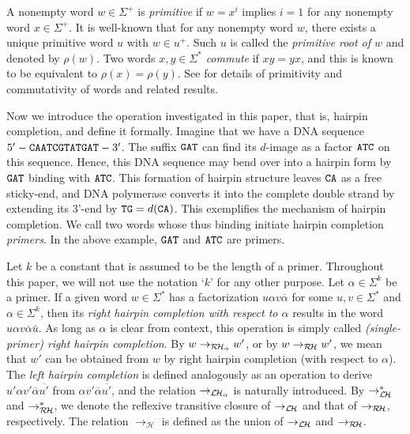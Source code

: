 \documentclass{article}
\theoremstyle{plain}
\theoremstyle{remark}
\newcommand{\LHC}{\ensuremath{\mathcal{L\hspace*{-0.5mm}H}}}
\newcommand{\RHC}{\ensuremath{\mathcal{R\hspace*{-0.5mm}H}}}
\newcommand{\HC}{\ensuremath{\mathcal{H}}}
\begin{document}
A nonempty word $w \in \Sigma^+$ is {\it primitive} if $w = x^i$ implies $i = 1$ for any nonempty word $x \in \Sigma^+$. 
It is well-known that for any nonempty word $w$, there exists a unique primitive word $u$ with $w \in u^+$. 
Such $u$ is called the {\it primitive root of $w$} and denoted by $\rho(w)$. 
Two words $x, y \in \Sigma^*$ {\it commute} if $xy = yx$, and this is known to be equivalent to $\rho(x) = \rho(y)$. 
See \cite{ChKa97} for details of primitivity and commutativity of words and related results. 

Now we introduce the operation investigated in this paper, that is, hairpin completion, and define it formally. 
Imagine that we have a DNA sequence $5'-{\tt CAATCGTATGAT}-3'$. 
The suffix ${\tt GAT}$ can find its $d$-image as a factor ${\tt ATC}$ on this sequence. 
Hence, this DNA sequence may bend over into a hairpin form by ${\tt GAT}$ binding with ${\tt ATC}$. 
This formation of hairpin structure leaves ${\tt CA}$ as a free sticky-end, and DNA polymerase converts it into the complete double strand by extending its 3'-end by ${\tt TG} = d({\tt CA})$. 
This exemplifies the mechanism of hairpin completion. 
We call two words whose thus binding initiate hairpin completion {\it primers}. 
In the above example, ${\tt GAT}$ and ${\tt ATC}$ are primers. 

Let $k$ be a constant that is assumed to be the length of a primer. 
Throughout this paper, we will not use the notation `$k$' for any other purpose. 
Let $\alpha \in \Sigma^k$ be a primer. 
If a given word $w \in \Sigma^*$ has a factorization $u \alpha v \overline{\alpha}$ for some $u, v \in \Sigma^*$ and $\alpha \in \Sigma^k$, then its {\it right hairpin completion with respect to $\alpha$} results in the word $u \alpha v \overline{\alpha} \bar{u}$. 
As long as $\alpha$ is clear from context, this operation is simply called {\it (single-primer) right hairpin completion}. 
By $w \to_{\RHC_\alpha} w'$, or by $w \to_{\RHC} w'$, we mean that $w'$ can be obtained from $w$ by right hairpin completion (with respect to $\alpha$). 
The {\it left hairpin completion} is defined analogously as an operation to derive $u' \alpha v' \overline{\alpha} \overline{u'}$ from $\alpha v' \overline{\alpha} \overline{u'}$, and the relation $\to_{\LHC_\alpha}$ is naturally introduced. 
By $\to_{\LHC}^*$ and $\to_{\RHC}^*$, we denote the reflexive transitive closure of $\to_{\LHC}$ and that of $\to_{\RHC}$, respectively. 
The relation $\to_{\HC}$ is defined as the union of $\to_{\LHC}$ and $\to_{\RHC}$. 
\end{document}
